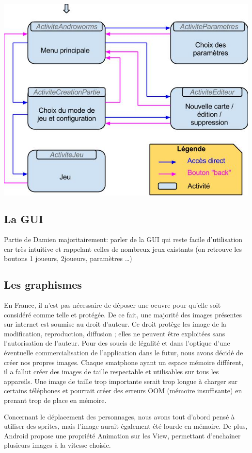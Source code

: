 \documentclass{report}
\begin{document}
\includegraphics[scale=0.5]{images/graph6}

\subsection{La GUI}

Partie de Damien majoritairement: parler de la GUI qui reste facile d’utilisation car très intuitive et rappelant celles de nombreux jeux existants (on retrouve les boutons 1 joueurs, 2joueurs, paramètres …)

\subsection{Les graphismes}
En France, il n’est pas nécessaire de déposer une oeuvre pour qu’elle soit considéré comme telle et protégée. De ce fait, une majorité des images présentes sur internet est soumise au droit d’auteur. Ce droit protège les image de la modification, reproduction, diffusion ; elles ne peuvent être exploitées sans l’autorisation de l’auteur.
Pour des soucis de légalité et dans l’optique d’une éventuelle commercialisation de l’application dans le futur, nous avons décidé de créer nos propres images.
Chaque smatphone ayant un espace mémoire différent, il a fallut créer des images de taille respectable et utilisables sur tous les appareils. Une image de taille trop importante serait trop longue à charger sur certains téléphones et pourrait créer des erreurs OOM (mémoire insuffisante) en prenant trop de place en mémoire.

Concernant le déplacement des personnages, nous avons tout d’abord pensé à utiliser des sprites, mais l’image aurait également été lourde en mémoire. De plus, Android propose une propriété Animation sur les View, permettant d’enchainer plusieurs images à la vitesse choisie.
\end{document}
